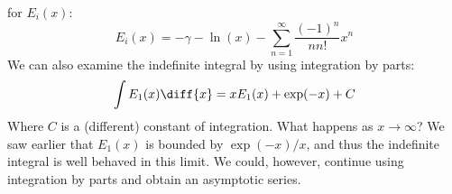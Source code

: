 \documentclass[crop=false,class=book,oneside]{standalone}
\begin{document}
            for $E_{i}(x)$:
            \begin{equation}
                E_{i}(x)=-\gamma-\ln(x)
                -\sum_{n=1}^{\infty}\frac{(-1)^{n}}{nn!}x^{n}
            \end{equation}
            We can also examine the indefinite integral by using
            integration by parts:
            \begin{equation}
                \int{E}_{1}(x)\diff{x}=
                xE_{1}(x)+\exp(-x)+C
            \end{equation}
            Where $C$ is a (different) constant of integration.
            What happens as $x\rightarrow\infty$? We saw earlier
            that $E_{1}(x)$ is bounded by
            $\exp(-x)/x$, and thus the indefinite integral is well
            behaved in this limit. We could, however, continue
            using integration by parts and obtain an asymptotic
            series.
\end{document}
